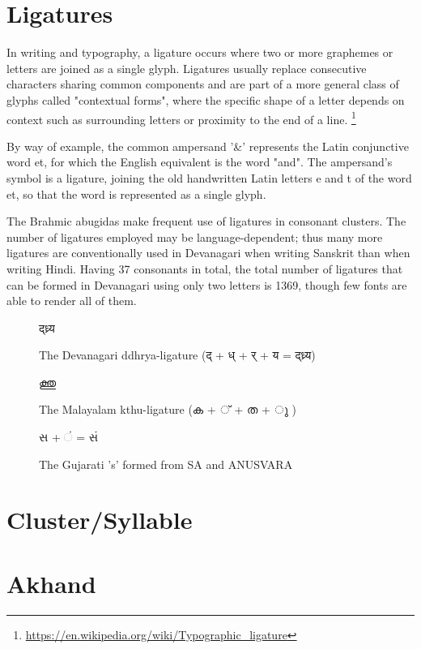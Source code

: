\section{Ligatures }

In writing and typography, a ligature occurs where two or more graphemes or letters are joined as a single glyph. Ligatures usually replace consecutive characters sharing common components and are part of a more general class of glyphs called "contextual forms", where the specific shape of a letter depends on context such as surrounding letters or proximity to the end of a line.
\footnote{\url{https://en.wikipedia.org/wiki/Typographic_ligature}}

By way of example, the common ampersand '\&' represents the Latin conjunctive word et, for which the English equivalent is the word "and". The ampersand's symbol is a ligature, joining the old handwritten Latin letters e and t of the word et, so that the word is represented as a single glyph.

The Brahmic abugidas make frequent use of ligatures in consonant clusters. The number of ligatures employed may be language-dependent; thus many more ligatures are conventionally used in Devanagari when writing Sanskrit than when writing Hindi. Having 37 consonants in total, the total number of ligatures that can be formed in Devanagari using only two letters is 1369, though few fonts are able to render all of them.

\begin{figure}[h]
   \centering
   {\hindi\textexample द्ध्र्य }
   \caption{The Devanagari ddhrya-ligature {\hindi (द् + ध् + र् + य = द्ध्र्य) } }
\end{figure}

\begin{figure}[h]
   \centering
   {\malayalam\textexample  ക്തു}
   \caption{The Malayalam kthu-ligature {\malayalam (ക + ് + ത + ു ) } }
\end{figure}

\begin{figure}[h]
  \centering
  {\gujarati\textexample સ +  ં = સં}
  \caption{The Gujarati 's' formed from SA and ANUSVARA}
\end{figure}

\section{Cluster/Syllable }

\section{Akhand }

